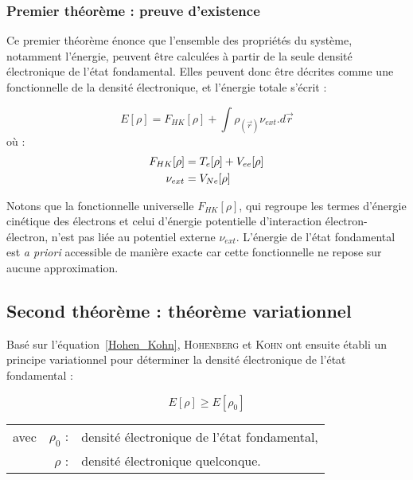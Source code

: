 	\subsubsection{Premier théorème : preuve d'existence}
	
	Ce premier théorème énonce que l'ensemble des propriétés du système, notamment l'énergie, peuvent être calculées à partir de la seule densité électronique de l'état fondamental. Elles peuvent donc être décrites comme une fonctionnelle de la densité électronique, et l'énergie totale s'écrit :
	
	\begin{equation}
	E[\rho] = F_{HK}[\rho] + \int \rho_{(\vec{r})} \nu_{ext} .d\vec{r}
	\label{Hohen_Kohn}
	\end{equation}
	\noindent où :
	\begin{align}
	F_{HK}[\rho] &= T_{e}[\rho] + V_{ee}[\rho] \\
	\nu_{ext} &= V_{Ne}[\rho] \notag
	\end{align}
	
	Notons que la fonctionnelle universelle $F_{HK}[\rho]$, qui regroupe les termes d'énergie cinétique des électrons et celui d'énergie potentielle d'interaction électron-électron, n'est pas liée au potentiel externe $\nu_{ext}$. L'énergie de l'état fondamental est \textit{a priori} accessible de manière exacte car cette fonctionnelle ne repose sur aucune approximation.
	
	\subsection{Second théorème : théorème variationnel}
	
	Basé sur l'équation~\ref{Hohen_Kohn}, \textsc{Hohenberg} et \textsc{Kohn} ont ensuite établi un principe variationnel pour déterminer la densité électronique de l'état fondamental :
	
	\begin{equation}
	E[\rho] \geq E[\rho_{0}]
	\end{equation}
	
	\begin{flushleft}
		\begin{tabular}{@{}lrp{10cm}}
			avec & $\rho_{0}$ : & densité électronique de l'état fondamental, \\
			& $\rho$ : & densité électronique quelconque.
		\end{tabular}
	\end{flushleft}
	
